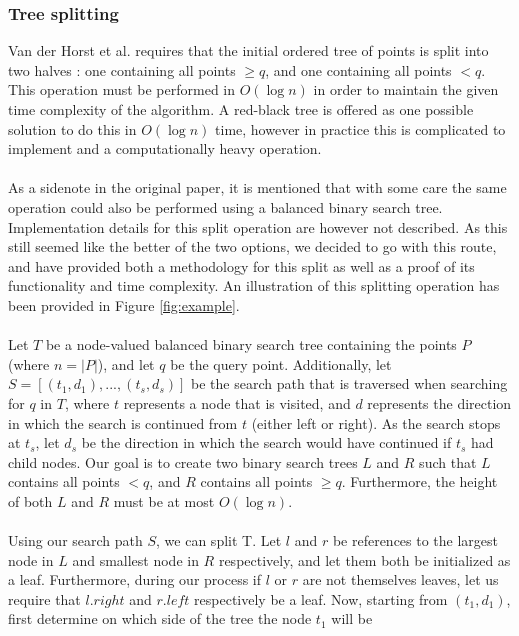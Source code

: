 \documentclass{article}
\newcommand{\fb}[1]{{#1}}
\begin{document}
\subsubsection{Tree splitting}
Van der Horst et al. requires that the initial ordered tree of points is split
into two halves \cite{vanderhorst_et_al:LIPIcs.ESA.2022.67}: one containing all
points $\geq q$, and one containing all points $< q$. This operation must be
performed in $O(\log n)$ in order to maintain the given time complexity of the
algorithm. A red-black tree is offered as one possible solution to do this in
$O(\log n)$ time, however in practice this is complicated to implement and a
computationally heavy operation.\\\\ As a sidenote in the original paper, it is
mentioned that with some care the same operation could also be performed using
a balanced binary search tree. Implementation details for this split operation
are however not described. As this still seemed like the better of the two
options, we decided to go with this route, and have provided both a methodology
for this split as well as a proof of its functionality and time complexity. An
illustration of this splitting operation has been provided in Figure
\ref{fig:example}. \\\\ Let $T$ be a node-valued balanced binary search tree
containing the points $P$ (where $n = |P|$), and let $q$ be the query point.
Additionally, let $S = [(t_1, d_1), ..., (t_s, d_s)]$ be the search path that
is traversed when searching for $q$ in $T$, where $t$ represents a node that is
visited, and $d$ represents the direction in which the search is continued from
$t$ (either left or right). As the search stops at $t_s$, let $d_s$ be the
direction in which the search would have continued if $t_s$ had child nodes.
Our goal is to create two binary search trees $L$ and $R$ such that $L$
contains all points $<q$, and $R$ contains all points $\geq q$. Furthermore,
the height of both $L$ and $R$ must be at most $O(\log n)$. \\\\ Using our
search path $S$, we can split T. Let $l$ and $r$ be references to the largest
node in $L$ and smallest node in $R$ respectively, and let them both be
initialized as a leaf. Furthermore, during \fb{our} process if $l$ or $r$ are not
\fb{themselves} leaves, let \fb{us require that} $l.right$ and $r.left$ respectively be a leaf. Now, starting from
$(t_1, d_1)$, first determine on which side of the tree the node $t_1$ will be
\end{document}
